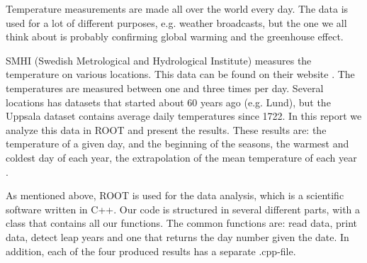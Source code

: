 

Temperature measurements are made all over the world every day. The data is used for a lot of different purposes, e.g. weather broadcasts, but the one we all think about is probably confirming global warming and the greenhouse effect. 

SMHI (Swedish Metrological and Hydrological Institute) measures the temperature on various locations. This data can be found on their website \cite{smhidata}. The temperatures are measured between one and three times per day. Several locations has datasets that started about 60 years ago (e.g. Lund), but the Uppsala dataset contains average daily temperatures since 1722. In this report we analyze this data in ROOT and present the results. These results are: the temperature of a given day, and the beginning of the seasons, the warmest and coldest day of each year, the extrapolation of the mean temperature of each year . 

As mentioned above, ROOT is used for the data analysis, which is a scientific software written in C++. Our code is structured in several different parts, with a class that contains all our functions. The common functions are: read data, print data, detect leap years and one that returns the day number given the date. In addition, each of the four produced results has a separate .cpp-file. 


